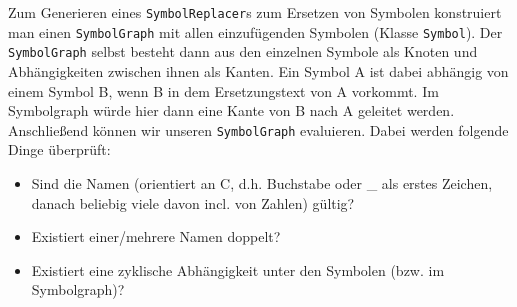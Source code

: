 Zum Generieren eines \texttt{SymbolReplacer}s zum Ersetzen von Symbolen
konstruiert man einen \texttt{SymbolGraph} mit allen einzufügenden Symbolen
(Klasse \texttt{Symbol}). Der \texttt{SymbolGraph} selbst besteht dann aus den
einzelnen Symbole als Knoten und Abhängigkeiten zwischen ihnen als Kanten. Ein
Symbol A ist dabei abhängig von einem Symbol B, wenn B in dem Ersetzungstext von
A vorkommt. Im Symbolgraph würde hier dann eine Kante von B nach A geleitet
werden. Anschließend können wir unseren \texttt{SymbolGraph} evaluieren. Dabei
werden folgende Dinge überprüft: \begin {itemize} \item Sind die Namen
(orientiert an C, d.h. Buchstabe oder \_ als erstes Zeichen, danach beliebig
viele davon incl. von Zahlen) gültig? \item Existiert einer/mehrere Namen
doppelt? \item Existiert eine zyklische Abhängigkeit unter den Symbolen (bzw. im
Symbolgraph)? \end {itemize}

